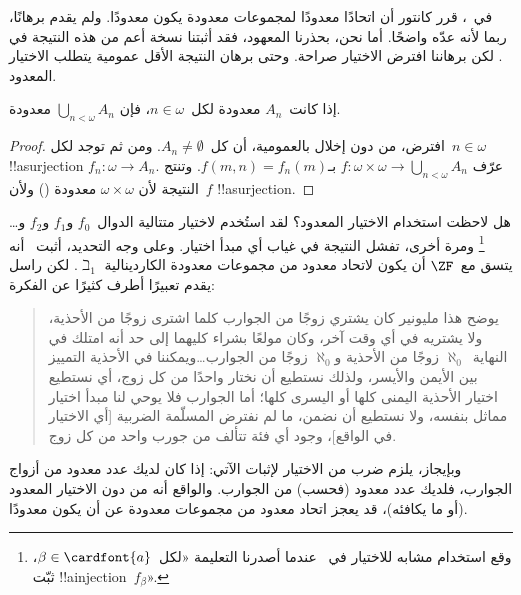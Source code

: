 \documentclass[../../../include/open-logic-section]{subfiles}
\begin{document}
\begin{ex}
في~\citeyear{Cantor1878}، قرر كانتور أن اتحادًا معدودًا لمجموعات
معدودة يكون معدودًا. ولم يقدم برهانًا، ربما لأنه عدّه واضحًا. أما
نحن، بحذرنا المعهود، فقد أثبتنا نسخة أعم من هذه النتيجة في
. لكن برهاننا افترض
الاختيار صراحة. وحتى برهان النتيجة الأقل عمومية يتطلب الاختيار
المعدود.

\begin{thm}
إذا كانت~$A_n$ معدودة لكل~$n \in \omega$، فإن
$\bigcup_{n < \omega} A_n$ معدودة.
\end{thm}

\begin{proof}
افترض، من دون إخلال بالعمومية، أن كل~$A_n \neq \emptyset$. ومن ثم
توجد لكل~$n \in \omega$ !!a{surjection}
$f_n \colon \omega \to A_n$. عرّف
$f \colon \omega \times \omega \to \bigcup_{n < \omega} A_n$
بـ$f(m, n) = f_n(m)$. وتنتج النتيجة لأن
$\omega \times \omega$ معدودة
() ولأن~$f$
!!a{surjection}.
\end{proof}
\noindent
هل لاحظت استخدام الاختيار المعدود؟ لقد استُخدم لاختيار متتالية
الدوال~$f_0$ و$f_1$ و$f_2$ و\dots\footnote{وقع استخدام مشابه
للاختيار في~ عندما
أصدرنا التعليمة «لكل~$\beta \in \cardfont{a}$، ثبّت
!!a{injection}~$f_\beta$».} ومرة أخرى، تفشل النتيجة في غياب أي مبدأ
اختيار. وعلى وجه التحديد، أثبت~\citet{FefermanLevy1963} أنه يتسق
مع~$\ZF$ أن يكون لاتحاد معدود من مجموعات معدودة الكاردينالية
$\beth_1$. لكن راسل يقدم تعبيرًا أطرف كثيرًا عن الفكرة:
\begin{quote}
  يوضح هذا مليونير كان يشتري زوجًا من الجوارب كلما اشترى زوجًا من
  الأحذية، ولا يشتريه في أي وقت آخر، وكان مولعًا بشراء كليهما إلى حد
  أنه امتلك في النهاية~$\aleph_0$ زوجًا من الأحذية و$\aleph_0$ زوجًا
  من الجوارب\dots\@ ويمكننا في الأحذية التمييز بين الأيمن والأيسر،
  ولذلك نستطيع أن نختار واحدًا من كل زوج، أي نستطيع اختيار الأحذية
  اليمنى كلها أو اليسرى كلها؛ أما الجوارب فلا يوحي لنا مبدأ اختيار
  مماثل بنفسه، ولا نستطيع أن نضمن، ما لم نفترض المسلّمة الضربية [أي
  الاختيار في الواقع]، وجود أي فئة تتألف من جورب واحد من كل زوج.
  \citep[p.~126]{Russell1919}
\end{quote}
وبإيجاز، يلزم ضرب من الاختيار لإثبات الآتي: إذا كان لديك عدد معدود
من أزواج الجوارب، فلديك عدد معدود (فحسب) من الجوارب. والواقع أنه من
دون الاختيار المعدود (أو ما يكافئه)، قد يعجز اتحاد معدود من مجموعات
معدودة عن أن يكون معدودًا.
\end{ex}
\end{document}
